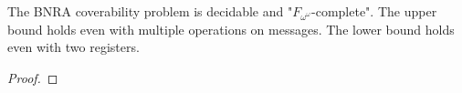 \begin{theorem}
	The BNRA coverability problem is decidable and "$F_{\omega^\omega}$-complete".
	The upper bound holds even with multiple operations on messages.
	The lower bound holds even with two registers.
\end{theorem}

\begin{proof}
\end{proof}
